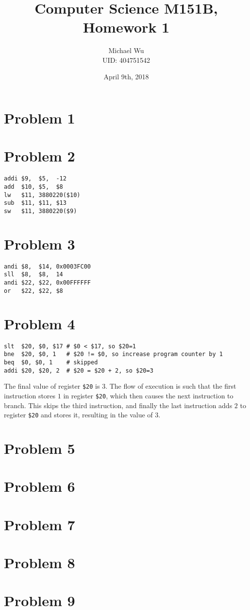 \documentclass[12pt]{article}
\begin{document}
\title{Computer Science M151B, Homework 1}
\date{April 9th, 2018}
\author{Michael Wu\\UID: 404751542}
\maketitle

\section*{Problem 1}
\section*{Problem 2}

\begin{verbatim}
addi $9,  $5,  -12
add  $10, $5,  $8
lw   $11, 3880220($10)
sub  $11, $11, $13
sw   $11, 3880220($9)
\end{verbatim}

\section*{Problem 3}

\begin{verbatim}
andi $8,  $14, 0x0003FC00
sll  $8,  $8,  14
andi $22, $22, 0x00FFFFFF
or   $22, $22, $8
\end{verbatim}

\section*{Problem 4}

\begin{verbatim}
slt  $20, $0, $17 # $0 < $17, so $20=1
bne  $20, $0, 1   # $20 != $0, so increase program counter by 1
beq  $0, $0, 1    # skipped
addi $20, $20, 2  # $20 = $20 + 2, so $20=3
\end{verbatim}

The final value of register \texttt{\$20} is \(3\). The flow of execution is such that the first instruction stores \(1\) in register
\texttt{\$20}, which then causes the next instruction to branch. This skips the third instruction, and finally the last instruction adds
\(2\) to register \texttt{\$20} and stores it, resulting in the value of \(3\).

\section*{Problem 5}
\section*{Problem 6}
\section*{Problem 7}
\section*{Problem 8}
\section*{Problem 9}
\end{document}
